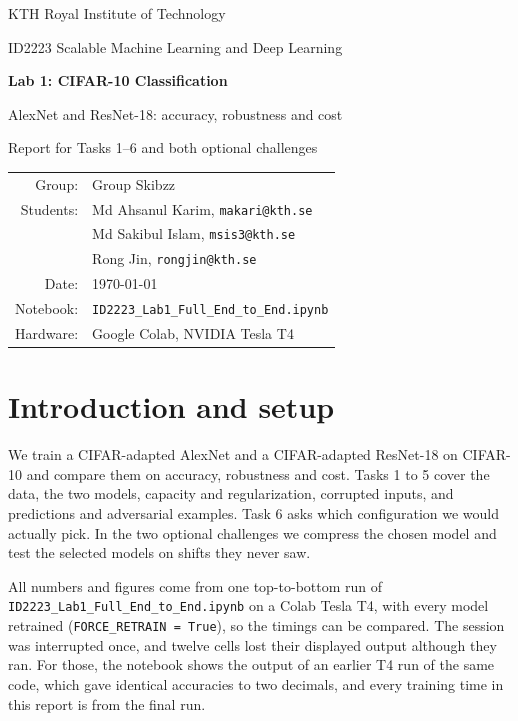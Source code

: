 \documentclass[11pt,a4paper]{article}
\begin{document}
\begin{titlepage}
\centering
\vspace*{28mm}
{\Large KTH Royal Institute of Technology\par}
\vspace{8mm}
{\large ID2223 Scalable Machine Learning and Deep Learning\par}
\vspace{20mm}
{\Huge\bfseries Lab 1: CIFAR-10 Classification\par}
\vspace{6mm}
{\LARGE AlexNet and ResNet-18: accuracy, robustness and cost\par}
\vspace{20mm}
{\large Report for Tasks 1--6 and both optional challenges\par}
\vfill
\begin{tabular}{rl}
Group: & Group Skibzz\\[3mm]
Students: & Md Ahsanul Karim, \texttt{makari@kth.se}\\
 & Md Sakibul Islam, \texttt{msis3@kth.se}\\
 & Rong Jin, \texttt{rongjin@kth.se}\\[5mm]
Date: & \today\\[5mm]
Notebook: & \texttt{ID2223\_Lab1\_Full\_End\_to\_End.ipynb}\\
Hardware: & Google Colab, NVIDIA Tesla T4\\
\end{tabular}
\vspace{25mm}
\end{titlepage}

\setcounter{tocdepth}{1}
\tableofcontents
\newpage

\section{Introduction and setup}

We train a CIFAR-adapted AlexNet and a CIFAR-adapted ResNet-18 on CIFAR-10 and compare them on accuracy, robustness and cost. Tasks 1 to 5 cover the data, the two models, capacity and regularization, corrupted inputs, and predictions and adversarial examples. Task 6 asks which configuration we would actually pick. In the two optional challenges we compress the chosen model and test the selected models on shifts they never saw.

All numbers and figures come from one top-to-bottom run of \texttt{ID2223\_Lab1\_\allowbreak Full\_\allowbreak End\_\allowbreak to\_\allowbreak End.ipynb} on a Colab Tesla T4, with every model retrained (\texttt{FORCE\_RETRAIN = True}), so the timings can be compared. The session was interrupted once, and twelve cells lost their displayed output although they ran. For those, the notebook shows the output of an earlier T4 run of the same code, which gave identical accuracies to two decimals, and every training time in this report is from the final run.
\end{document}
